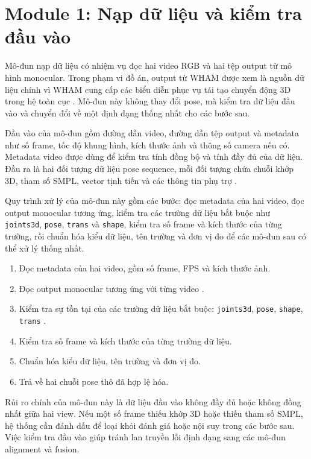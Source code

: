 \documentclass[../DoAn.tex]{subfiles}
\begin{document}
\section{Module 1: Nạp dữ liệu và kiểm tra đầu vào}
\label{sec:data_loader}

Mô-đun nạp dữ liệu có nhiệm vụ đọc hai video RGB và hai tệp output từ mô hình monocular. Trong phạm vi đồ án, output từ WHAM được xem là nguồn dữ liệu chính vì WHAM cung cấp các biểu diễn phục vụ tái tạo chuyển động 3D trong hệ toàn cục \cite{shin2024wham}. Mô-đun này không thay đổi pose, mà kiểm tra dữ liệu đầu vào và chuyển đổi về một định dạng thống nhất cho các bước sau.

Đầu vào của mô-đun gồm đường dẫn video, đường dẫn tệp output và metadata như số frame, tốc độ khung hình, kích thước ảnh và thông số camera nếu có. Metadata video được dùng để kiểm tra tính đồng bộ và tính đầy đủ của dữ liệu. Đầu ra là hai đối tượng dữ liệu pose sequence, mỗi đối tượng chứa chuỗi khớp 3D, tham số SMPL, vector tịnh tiến và các thông tin phụ trợ \cite{shin2024wham,smpl2015}.

Quy trình xử lý của mô-đun này gồm các bước: đọc metadata của hai video, đọc output monocular tương ứng, kiểm tra các trường dữ liệu bắt buộc như \texttt{joints3d}, \texttt{pose}, \texttt{trans} và \texttt{shape}, kiểm tra số frame và kích thước của từng trường, rồi chuẩn hóa kiểu dữ liệu, tên trường và đơn vị đo để các mô-đun sau có thể xử lý thống nhất.

\begin{enumerate}[leftmargin=*, label=\arabic*.]
    \item Đọc metadata của hai video, gồm số frame, FPS và kích thước ảnh.
    \item Đọc output monocular tương ứng với từng video \cite{shin2024wham}.
    \item Kiểm tra sự tồn tại của các trường dữ liệu bắt buộc: \texttt{joints3d}, \texttt{pose}, \texttt{shape}, \texttt{trans} \cite{smpl2015}.
    \item Kiểm tra số frame và kích thước của từng trường dữ liệu.
    \item Chuẩn hóa kiểu dữ liệu, tên trường và đơn vị đo.
    \item Trả về hai chuỗi pose thô đã hợp lệ hóa.
\end{enumerate}

Rủi ro chính của mô-đun này là dữ liệu đầu vào không đầy đủ hoặc không đồng nhất giữa hai view. Nếu một số frame thiếu khớp 3D hoặc thiếu tham số SMPL, hệ thống cần đánh dấu để loại khỏi đánh giá hoặc nội suy trong các bước sau. Việc kiểm tra đầu vào giúp tránh lan truyền lỗi định dạng sang các mô-đun alignment và fusion.
\end{document}
